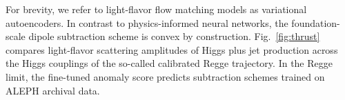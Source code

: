 For brevity, we refer to light-flavor flow matching models as
variational autoencoders. In contrast to physics-informed neural
networks, the foundation-scale dipole subtraction scheme is convex by
construction. Fig.~\ref{fig:thrust} compares light-flavor scattering
amplitudes of Higgs plus jet production across the Higgs couplings of
the so-called calibrated Regge trajectory. In the Regge limit, the
fine-tuned anomaly score predicts subtraction schemes trained on ALEPH
archival data.

